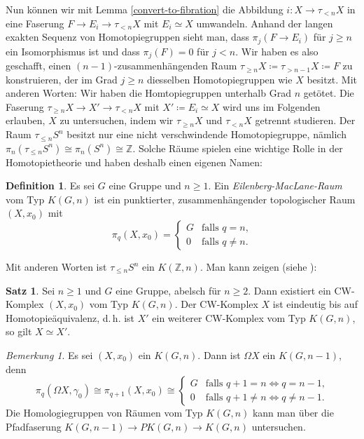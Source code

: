 \documentclass[11pt, a4paper, german]{article}
\theoremstyle{definition}
\newtheorem{satz}[lem]{Satz}
\newtheorem{defn}[lem]{Definition}
\theoremstyle{remark}
\newtheorem*{bem}{Bemerkung}
\newcommand{\Z}{\mathbb{Z}} %
\newcommand{\trunc}[2]{\tau_{#1} #2} %
\renewcommand{\dh}{d.\,h.} %
\begin{document}
Nun können wir mit Lemma \ref{convert-to-fibration} die Abbildung $i : X \to \trunc{< n}{X}$ in eine Faserung $F \to E_i \to \trunc{< n}{X}$ mit $E_i \simeq X$ umwandeln.
Anhand der langen exakten Sequenz von Homotopiegruppen sieht man, dass $\pi_j(F \to E_i)$ für $j \geq n$ ein Isomorphismus ist und dass $\pi_j(F) = 0$ für $j < n$.
Wir haben es also geschafft, einen $(n{-}1)$-zusammenhängenden Raum $\trunc{\geq n}{X} \coloneqq \trunc{> n-1}{X} \coloneqq F$ zu konstruieren, der im Grad $j \geq n$ diesselben Homotopiegruppen wie $X$ besitzt.
Mit anderen Worten: Wir haben die Homtopiegruppen unterhalb Grad $n$ getötet.
Die Faserung $\trunc{\geq n}{X} \to X' \to \trunc{< n}{X}$ mit $X' \coloneqq E_i \simeq X$ wird uns im Folgenden erlauben, $X$ zu untersuchen, indem wir $\trunc{\geq n}{X}$ und $\trunc{< n}{X}$ getrennt studieren.
Der Raum $\trunc{\leq n}{S^n}$ besitzt nur eine nicht verschwindende Homotopiegruppe, nämlich $\pi_n(\trunc{\leq n}{S^n}) \cong \pi_n(S^n) \cong \Z$.
Solche Räume spielen eine wichtige Rolle in der Homotopietheorie und haben deshalb einen eigenen Namen:

\begin{defn}
  Es sei $G$ eine Gruppe und $n \geq 1$.
  Ein \emph{Eilenberg-MacLane-Raum} vom Typ $K(G, n)$ ist ein punktierter, zusammenhängender topologischer Raum $(X, x_0)$ mit
  \[
    \pi_q(X, x_0) = \begin{cases}
      G & \text{falls $q = n$,} \\
      0 & \text{falls $q \neq n$.}
    \end{cases}
  \]
\end{defn}

Mit anderen Worten ist $\trunc{\leq n}{S^n}$ ein $K(\Z, n)$.
Man kann zeigen (siehe \cite[365-366]{hatcher:at}):

\begin{satz}
  Sei $n \geq 1$ und $G$ eine Gruppe, abelsch für $n \geq 2$.
  Dann existiert ein CW-Komplex $(X, x_0)$ vom Typ $K(G, n)$.
  Der CW-Komplex $X$ ist eindeutig bis auf Homotopieäquivalenz, \dh{} ist $X'$ ein weiterer CW-Komplex vom Typ $K(G, n)$, so gilt $X \simeq X'$.
\end{satz}

\begin{bem}
  Es sei $(X, x_0)$ ein $K(G, n)$. Dann ist $\Omega X$ ein $K(G, n-1)$, denn
  \[
    \pi_q(\Omega X, \gamma_0) \cong
    \pi_{q+1}(X, x_0) \cong
    \begin{cases}
      G & \text{falls $q+1 = n \iff q = n-1$,} \\
      0 & \text{falls $q+1 \neq n \iff q \neq n-1$.}
    \end{cases}
  \]
  Die Homologiegruppen von Räumen vom Typ $K(G, n)$ kann man über die Pfadfaserung $K(G, n{-}1) \to P K(G, n) \to K(G, n)$ untersuchen.
\end{bem}
\end{document}
